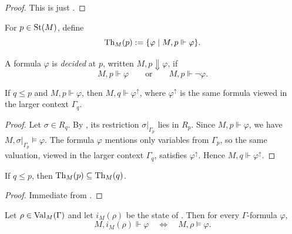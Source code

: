 \begin{proof}
This is just .
\end{proof}

\begin{definition}\label{def:state-theory}
For $p\in\mathrm{St}(M)$, define
\[
\mathrm{Th}_M(p):=\{\varphi\mid M,p\Vdash\varphi\}.
\]
\end{definition}

\begin{definition}[Decidedness]\label{def:decidedness}
A formula $\varphi$ is \emph{decided} at $p$, written $M,p\Downarrow\varphi$, if
\[
M,p\Vdash\varphi
\qquad\text{or}\qquad
M,p\Vdash\neg\varphi.
\]
\end{definition}

\begin{proposition}\label{prop:forcing-persistence}
If $q\le p$ and $M,p\Vdash\varphi$, then $M,q\Vdash\varphi^\uparrow$, where $\varphi^\uparrow$ is the same formula viewed in the larger context $\Gamma_q$.
\end{proposition}

\begin{proof}
Let $\sigma\in R_q$. By , its restriction $\sigma|_{\Gamma_p}$ lies in $R_p$. Since $M,p\Vdash\varphi$, we have $M,\sigma|_{\Gamma_p}\models\varphi$. The formula $\varphi$ mentions only variables from $\Gamma_p$, so the same valuation, viewed in the larger context $\Gamma_q$, satisfies $\varphi^\uparrow$. Hence $M,q\Vdash\varphi^\uparrow$.
\end{proof}

\begin{corollary}\label{cor:state-theory-monotonicity}
If $q\le p$, then $\mathrm{Th}_M(p)\subseteq \mathrm{Th}_M(q)$.
\end{corollary}

\begin{proof}
Immediate from .
\end{proof}

\begin{proposition}\label{prop:singleton-conservativity}
Let $\rho\in\mathrm{Val}_M(\Gamma)$ and let $i_M(\rho)$ be the state of . Then for every $\Gamma$-formula $\varphi$,
\[
M,i_M(\rho)\Vdash\varphi
\quad\Longleftrightarrow\quad
M,\rho\models\varphi.
\]
\end{proposition}

